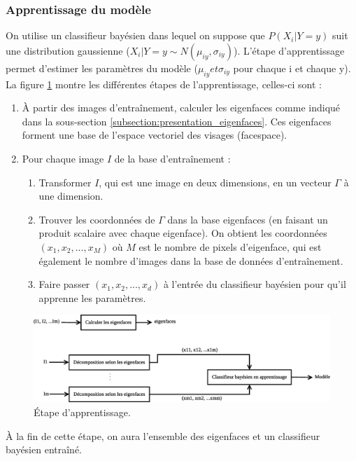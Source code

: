 \subsubsection{Apprentissage du modèle}
On utilise un classifieur bayésien dans lequel on suppose que $P(X_i|Y=y)$ suit une distribution
gaussienne ($X_i|Y=y \sim N(\mu_{iy}, \sigma_{iy})$).
L'étape d'apprentissage permet d'estimer les paramètres du modèle ($\mu_{iy} et
\sigma_{iy}$ pour chaque i et chaque y).
La figure \ref{fig:article:etapes_apprentissage} montre les différentes étapes
de l'apprentissage, celles-ci sont :
\begin{enumerate}
    \item À partir des images d’entraînement, calculer les eigenfaces
    comme indiqué dans la sous-section \ref{subsection:presentation_eigenfaces}.
    Ces eigenfaces forment une base de l'espace vectoriel des visages (facespace).
    \item Pour chaque image $I$ de la base d'entraînement :
    \begin{enumerate}
        \item Transformer $I$, qui est une image en deux dimensions, en un
        vecteur $\Gamma$ à une dimension.
        \item Trouver les coordonnées de $\Gamma$ dans la base eigenfaces
        (en faisant un produit scalaire avec chaque eigenface).
        On obtient les coordonnées $(x_1, x_2, ..., x_M)$ où $M$
        est le nombre de pixels d'eigenface, qui est également le nombre d'images
        dans la base de données d'entraînement.
        \item Faire passer $(x_1, x_2, ..., x_d)$ à l'entrée du classifieur
        bayésien pour qu'il apprenne les paramètres.
    \end{enumerate}
\end{enumerate}
\begin{figure}[H]
    \centering
    \includegraphics[scale=0.4]{images/article_etapes_apprentissage}
    \caption{Étape d'apprentissage.}
    \label{fig:article:etapes_apprentissage}
\end{figure}
À la fin de cette étape, on aura l'ensemble des eigenfaces et un classifieur 
bayésien entraîné.

